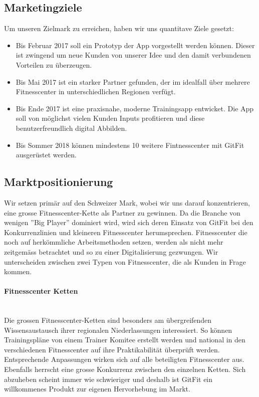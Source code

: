 \subsection{Marketingziele}
Um unseren Zielmark zu erreichen, haben wir uns quantitave Ziele gesetzt:
\begin{itemize}
	\item Bis Februar 2017 soll ein Prototyp der App vorgestellt werden können. Dieser ist zwingend um neue Kunden von unserer Idee und den damit verbundenen Vorteilen zu überzeugen.
	\item Bis Mai 2017 ist ein starker Partner gefunden, der im idealfall über mehrere Fitnesscenter in unterschiedlichen Regionen verfügt.
	\item Bis Ende 2017 ist eine praxisnahe, moderne Trainingsapp entwicket. Die App soll von möglichst vielen Kunden Inputs profitieren und diese benutzerfreundlich digital Abbilden.
	\item Bis Sommer 2018 können mindestens 10 weitere Fintnesscenter mit GitFit ausgerüstet werden.
\end{itemize}

\subsection{Marktpositionierung}
Wir setzen primär auf den Schweizer Mark, wobei wir uns darauf konzentrieren, eine grosse Fitnesscenter-Kette als Partner zu gewinnen. Da die Branche von wenigen ''Big Player'' dominiert wird,  wird sich deren Einsatz von GitFit bei den Konkurrenzlinien und kleineren Fitnesscenter herumsprechen. Fitnesscenter die noch auf herkömmliche Arbeitsmethoden setzen, werden als nicht mehr zeitgemäss betrachtet und so zu einer Digitalisierung gezwungen. Wir unterscheiden zwischen zwei Typen von Fitnesscenter, die als Kunden in Frage kommen.

\paragraph{Fitnesscenter Ketten} \hfill \\
Die grossen Fitnesscenter-Ketten sind besonders am übergreifenden Wissensaustausch ihrer regionalen Niederlassungen interessiert. So können Trainingspläne von einem Trainer Komitee erstellt werden und national in den verschiedenen Fitnesscenter auf ihre Praktikabilität überprüft werden. Entsprechende Anpassungen wirken sich auf alle beteiligten Fitnesscenter aus. Ebenfalls herrscht eine grosse Konkurrenz zwischen den einzelnen Ketten. Sich abzuheben scheint immer wie schwieriger und deshalb ist GitFit ein willkommenes Produkt zur eigenen Hervorhebung im Markt. 

